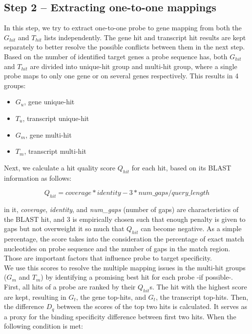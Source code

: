 \subsection{Step 2 – Extracting one-to-one mappings}

In this step, we try to extract one-to-one probe to gene mapping from both the 
$G_{hit}$ and $T_{hit}$ lists independently. 
The gene hit and transcript hit results are kept separately to better resolve 
the possible conflicts between them in the next step. 
Based on the number of identified target genes a probe sequence has, both 
$G_{hit}$ and $T_{hit}$ are divided into unique-hit group and 
multi-hit group, where a single probe maps to only one gene or on several genes 
respectively. This results in 4 groups: 

\begin{itemize}
\item $G_u$, gene unique-hit
\item $T_u$, transcript unique-hit
\item $G_m$, gene multi-hit
\item $T_m$, transcript multi-hit
\end{itemize}

Next, we calculate a hit quality score $Q_{hit}$ for each hit, based on its 
BLAST information as follows:  

\begin{equation}
Q_{hit} = coverage * identity - 3 * num\_gaps / query\_length
\end{equation}

in it, \textit{coverage},  \textit{identity}, and \textit{num\_gaps} (number 
of gaps) are characteristics of the BLAST hit, 
and $3$ is empirically chosen such that enough penalty is given to gaps but not 
overweight it so much that $Q_{hit}$ can become negative. As a simple 
percentage, the score takes into the consideration the percentage of exact 
match nucleotides on probe sequence and the number of gaps in the match region. 
Those are important factors that influence probe to target specificity.  \\
We use this scores to resolve the multiple mapping issues in the multi-hit 
groups ($G_m$ and $T_m$) by identifying a promising best hit for each probe -if 
possible-.
First, all hits of a probe are ranked by their $Q_{hit}$s. The hit with the 
highest score are kept, resulting in $G_t$, the gene top-hits, and $G_t$, the 
transcript top-hits.
Then, the difference $D_q$ between the scores of the top two hits is 
calculated. 
It serves as a proxy for the binding specificity difference between first two 
hits. When the following condition is met: 

